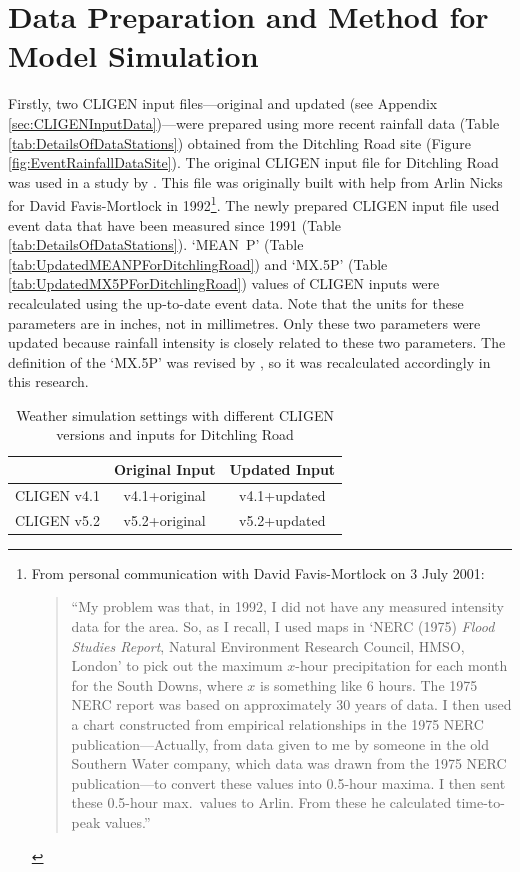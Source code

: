 \section{Data Preparation and Method for Model Simulation}
\label{sec:ImprovedCligenMethods}
Firstly, two CLIGEN input files---original and updated (see Appendix
\ref{sec:CLIGENInputData})---were prepared using more recent rainfall data
(Table \ref{tab:DetailsOfDataStations}) obtained from the Ditchling Road site
(Figure \ref{fig:EventRainfallDataSite}). The original CLIGEN input file for
Ditchling Road was used in a study by \citet{favis-mortlock1998-141}. This file
was originally built with help from Arlin Nicks for David Favis-Mortlock in
1992\footnote{From personal communication with David Favis-Mortlock on 3 July
2001: \begin{quotation} ``My problem was that, in 1992, I did not have any
measured intensity data for the area. So, as I recall, I used maps in `NERC
(1975) \textit{Flood Studies Report}, Natural Environment Research Council,
HMSO, London' to pick out the maximum $x$-hour precipitation for each month for
the South Downs, where $x$ is something like 6 hours. The 1975 NERC report was
based on approximately 30 years of data. I then used a chart constructed from
empirical relationships in the 1975 NERC publication---Actually, from data given
to me by someone in the old Southern Water company, which data was drawn from
the 1975 NERC publication---to convert these values into 0.5-hour maxima. I then
sent these 0.5-hour max.\ values to Arlin. From these he calculated time-to-peak
values.'' \end{quotation}}. The newly prepared CLIGEN input file used event data
that have been measured since 1991 (Table \ref{tab:DetailsOfDataStations}).
`MEAN~P' (Table \ref{tab:UpdatedMEANPForDitchlingRoad}) and `{MX.5P}' (Table
\ref{tab:UpdatedMX5PForDitchlingRoad}) values of CLIGEN inputs were recalculated
using the up-to-date event data. Note that the units for these parameters are in
inches, not in millimetres. Only these two parameters were updated because
rainfall intensity is closely related to these two parameters. The definition of
the `{MX.5P}' was revised by \citet{yu2000-301}, so it was recalculated
accordingly in this research.

\begin{table}[htbp]
  \centering
  \small
  \caption{Weather simulation settings with different CLIGEN versions and inputs
for Ditchling Road}
  \label{tab:CLIGENSimulationSettingsWithDifferentInputsAndVersions}
  \begin{tabular}{ccc}
  \toprule
        & Original Input & Updated Input \\
  \midrule
  CLIGEN v4.1 & v4.1+original & v4.1+updated \\
  \midrule
  CLIGEN v5.2 & v5.2+original & v5.2+updated \\
  \bottomrule
  \end{tabular}
\end{table}

